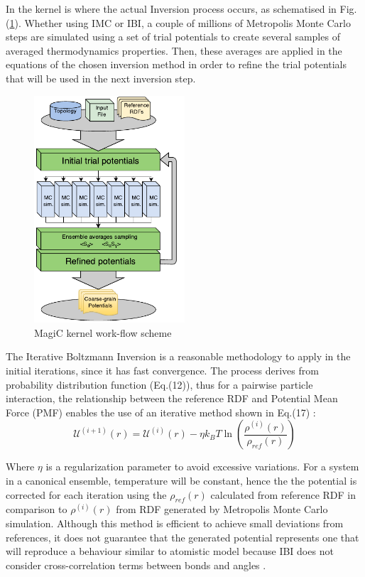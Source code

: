 \documentclass[10pt,a4paper,twoside]{article}
\begin{document}
 In the kernel is where the actual Inversion process occurs, as schematised in Fig.(\ref{Fig:kernel}). Whether using IMC or IBI, a couple of millions of Metropolis Monte Carlo steps are simulated using a set of trial potentials to create several samples of averaged thermodynamics properties. Then, these averages are applied in the equations of the chosen inversion method in order to refine the trial potentials that will be used in the next inversion step.
 \begin{figure}[ht!]
  \begin{center}
	\includegraphics[width=0.50\textwidth]{./images/magiccore}
	\caption{MagiC kernel work-flow scheme}
	\label{Fig:kernel}
  \end{center}
\end{figure}
 
 The Iterative Boltzmann Inversion is a reasonable methodology to apply in the initial iterations, since it has fast convergence. The process derives from probability distribution function (Eq.(12)), thus for a pairwise particle interaction, the relationship between the reference RDF and Potential Mean Force (PMF) enables the use of an iterative method shown in Eq.(17) \cite{ibi}:
   \begin{equation}
\mathcal{U}^{(i+1)}(r) = \mathcal{U}^{(i)}(r) - \eta k_B T \ln{\left(\dfrac{\rho^{(i)}(r)}{\rho_{ref}(r)}\right)}
\label{eqn:ibi}
\end{equation}

 Where $\eta$ is a regularization parameter to avoid excessive variations. For a system in a canonical ensemble, temperature will be constant, hence the the potential is corrected for each iteration using the $\rho_{ref}(r)$ calculated from reference RDF in comparison to $\rho^{(i)}(r)$ from  RDF generated by Metropolis Monte Carlo simulation. Although this method is efficient to achieve small deviations from references, it does not guarantee that the generated potential represents one that will reproduce a behaviour similar to atomistic model because IBI does not consider cross-correlation terms between bonds and angles \cite{magic}.   
 
\end{document}
